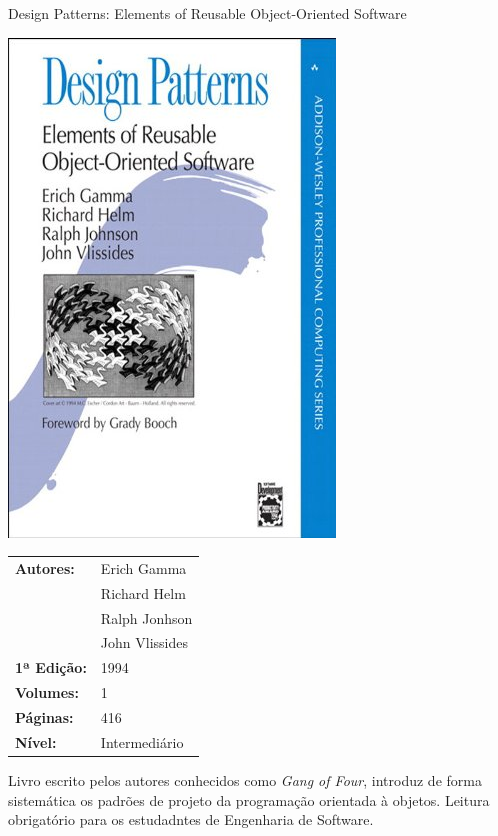 \begin{frame}[fragile]{Design Patterns: Elements of Reusable Object-Oriented Software}

    \begin{minipage}{0.4\textwidth}
        \includegraphics[scale=0.25]{gang.jpg}
    \end{minipage}
    \begin{minipage}{0.5\textwidth}
        \begin{small}
            \begin{tabularx}{0.95\textwidth}{lX}
                \textbf{Autores:} & Erich Gamma \\
                & Richard Helm \\
                & Ralph Jonhson \\
                & John Vlissides \\
                \textbf{1ª Edição:} & 1994 \\
                \textbf{Volumes:} & 1 \\
                \textbf{Páginas:} & 416 \\
                \textbf{Nível:} & Intermediário \\
            \end{tabularx}
        \end{small}
    \end{minipage}

    \vspace{0.2in} 

    Livro escrito pelos autores conhecidos como \textit{Gang of Four}, introduz de forma
    sistemática os padrões de projeto da programação orientada à objetos. Leitura
    obrigatório para os estudadntes de Engenharia de Software.
\end{frame}

